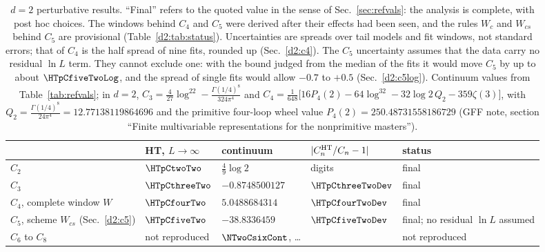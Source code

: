 \begin{table}[ht]
\centering\small
\begin{tabular}{@{}llllp{3.1cm}@{}}
\toprule
 & HT, $L\to\infty$ & continuum & $|C_n^{\rm HT}/C_n-1|$ & status \\\midrule
$C_2$ & $\HTpCtwoTwo$ & $\frac49\log2$ & \HTpCtwoTwoDigits{} digits & final \\
$C_3$ & $\HTpCthreeTwo$ & $-0.8748500127$ & $\HTpCthreeTwoDev$ & final \\
$C_4$, complete window $W$ & $\HTpCfourTwo$ & $5.0488684314$ & $\HTpCfourTwoDev$ & final \\
$C_5$, scheme $W_{cs}$ (Sec.~\ref{d2:c5}) & $\HTpCfiveTwo$ & $-38.8336459$ & $\HTpCfiveTwoDev$ & final; no residual $\ln L$ assumed \\
$C_6$ to $C_8$ & not reproduced & $\NTwoCsixCont$, \dots & & not reproduced \\
\bottomrule
\end{tabular}
\caption{$d=2$ perturbative results. ``Final'' refers to the quoted value in the sense of Sec.~\ref{sec:refvals}: the
analysis is complete, with post hoc choices. The windows behind $C_4$ and $C_5$ were derived after their effects had been
seen, and the rules $W_c$ and $W_{cs}$ behind $C_5$ are provisional (Table~\ref{d2:tab:status}). Uncertainties are spreads
over tail models and fit windows, not standard errors; that of $C_4$ is the half spread of nine fits, rounded up
(Sec.~\ref{d2:c4}).
The $C_5$ uncertainty assumes that the data carry no residual $\ln L$ term. They cannot exclude one: with the bound
judged from the median of the fits it would move $C_5$ by up to about $\HTpCfiveTwoLog$, and the spread of single fits
would allow $-0.7$ to $+0.5$ (Sec.~\ref{d2:c5log}). Continuum values from Table~\ref{tab:refvals}; in $d=2$,
$C_3=\frac4{27}\log^22-\frac{\Gamma(1/4)^8}{324\pi^4}$ and $C_4=\frac1{648}\big[16P_4(2)-64\log^32-32\log2\,Q_2-359\zeta(3)\big]$,
with $Q_2=\frac{\Gamma(1/4)^8}{24\pi^4}=12.77138119864696$ and the primitive four-loop wheel value $P_4(2)=250.48731558186729$
(GFF note, section ``Finite multivariable representations for the nonprimitive masters'').}
\label{d2:tab:summary}
\end{table}

